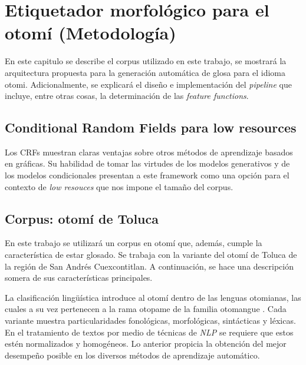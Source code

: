 \documentclass[letterpaper,12pt,oneside]{book}
\begin{document}
\chapter{Etiquetador morfológico para el otomí (Metodología)}

En este capitulo se describe el corpus utilizado en este trabajo, se mostrará la arquitectura propuesta para la generación automática de glosa para el idioma otomi. Adicionalmente, se explicará el diseño e implementación del \textit{pipeline} que incluye, entre otras cosas, la determinación de las \textit{feature functions}.


\section{Conditional Random Fields para low resources}

Los CRFs muestran claras ventajas sobre otros métodos de aprendizaje basados en gráficas. Su habilidad de tomar las virtudes de los modelos generativos y de los modelos condicionales presentan a este framework como una opción para el contexto de \textit{low resouces} que nos impone el tamaño del corpus.
 

\section{Corpus: otomí de Toluca}

En este trabajo se utilizará un corpus en otomí que, además, cumple la característica de estar glosado. Se trabaja con la variante del otomí de Toluca de la región de San Andrés Cuexcontitlan. A continuación, se hace una descripción somera de sus características principales.

La clasificación lingüística introduce al otomí dentro de las lenguas otomianas, las cuales a su vez pertenecen a la rama otopame de la familia otomangue \citep{barrientos2004otomies}. Cada variante muestra particularidades fonológicas, morfológicas, sintácticas y léxicas. En el tratamiento de textos por medio de técnicas de \textit{NLP} se requiere que estos estén normalizados y homogéneos. Lo anterior propicia la obtención del mejor desempeño posible en los diversos métodos de aprendizaje automático. 
\end{document}
